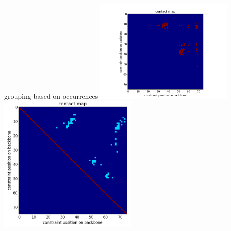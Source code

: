 \documentclass{beamer}
\begin{document}
\begin{frame}{grouping based on occurrences}
    \centering
    \includegraphics[trim = 25mm 0mm 25mm 10mm, clip,width=0.5\textwidth]{img/groupByOccurrence}
    \includegraphics[width=0.5\textwidth]{img/contactMapNatives}
\end{frame}
\end{document}

